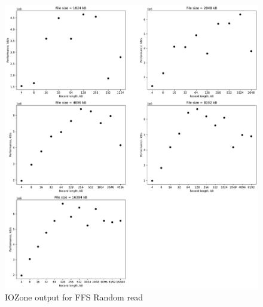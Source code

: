 \begin{figure}[!htb]
	\label{fig:app_bench_ffs_rnd_read}
	\begin{center}
		\includegraphics[width=1.0\textwidth]{figures/benchmarking/ffs/Random read.pdf}
	\end{center}
	\caption{IOZone output for FFS Random read}
\end{figure}

